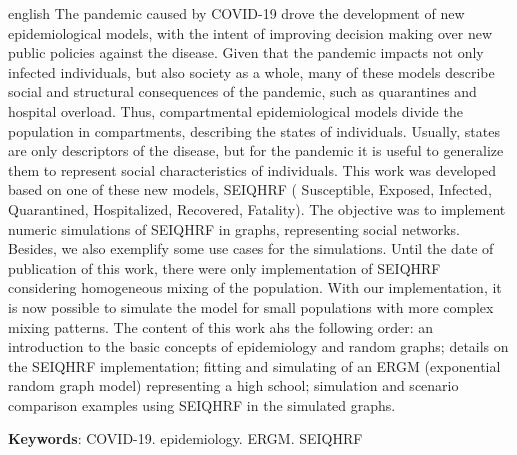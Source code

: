 \begin{resumo}[Abstract]
 \begin{otherlanguage*}{english}
   The pandemic caused by COVID-19 drove the development of new epidemiological 
   models, with the intent of improving decision making over new public policies 
   against the disease. 
   Given that the pandemic impacts not only infected individuals, but also 
   society as a whole, many of these models describe social and structural 
   consequences of the pandemic, such as quarantines and hospital overload. 
   Thus, compartmental epidemiological models divide the population in 
   compartments, describing the states of individuals. Usually, states are only 
   descriptors of the disease, but for the pandemic it is useful to generalize 
   them to represent social characteristics of individuals. 
   This work was developed based on one of these new models, SEIQHRF (
   Susceptible, Exposed, Infected, Quarantined, Hospitalized, 
  Recovered, Fatality). The objective was to implement numeric simulations of 
  SEIQHRF in graphs, representing social networks. 
  Besides, we also exemplify some use cases for the simulations. Until the date 
  of publication of this work, there were only implementation of SEIQHRF 
  considering homogeneous mixing of the population. With our implementation, 
  it is now possible to simulate the model for small populations with more 
  complex mixing patterns.
  The content of this work ahs the following order: an introduction to the 
  basic concepts of epidemiology and random graphs; details on the SEIQHRF 
  implementation; fitting and simulating of an ERGM (exponential random 
  graph model) representing a high school; simulation and scenario comparison 
  examples using SEIQHRF in the simulated graphs.

   \vspace{\onelineskip}
 
   \noindent 
   \textbf{Keywords}: COVID-19. epidemiology. ERGM. SEIQHRF
 \end{otherlanguage*}
\end{resumo}

\listoffigures*
\cleardoublepage

\listoftables*
\cleardoublepage


